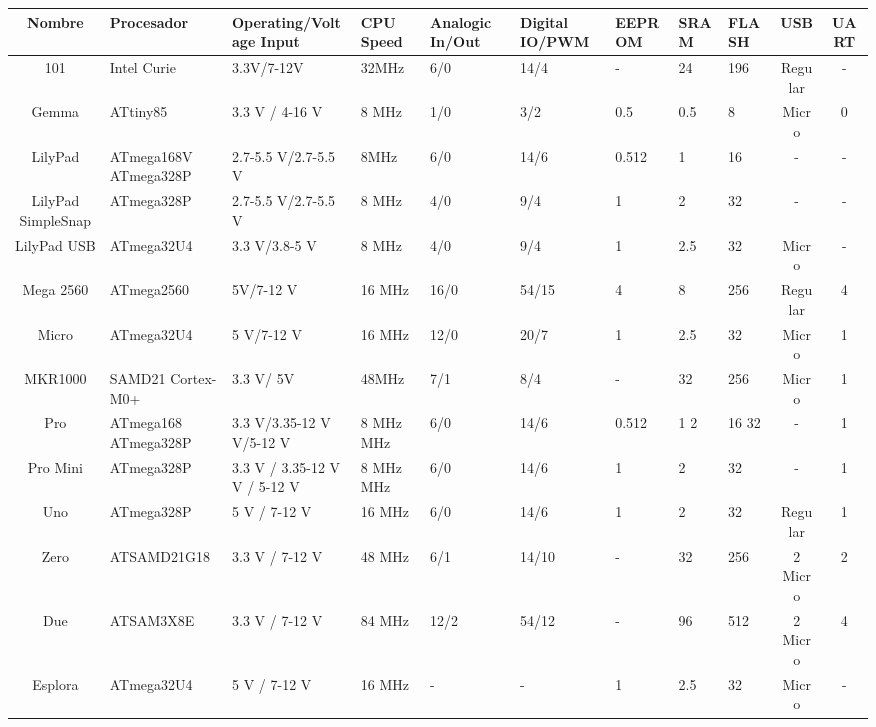 \documentclass[11pt,twoside]{book}
\begin{document}
\begin{table}[htb]
\begin{center}
\resizebox{16cm}{!} {
\begin{tabular}{|c|m{3cm}|m{3.5cm}|m{2cm}|m{2cm}|m{2cm}|m{2cm}|m{2cm}|m{2cm}|c|c|}
\hline
Nombre & Procesador & Operating/Voltage Input & CPU Speed & Analogic In/Out & Digital IO/PWM & EEPROM & SRAM & FLASH & USB & UART \\
\hline
101 & Intel Curie & 3.3V/7-12V & 32MHz & 6/0 & 14/4 & - & 24 & 196 & Regular & - \\ 
\hline
Gemma & ATtiny85 & 3.3 V / 4-16 V & 8 MHz & 1/0 & 3/2 & 0.5 & 0.5 & 8 & Micro & 0 \\
\hline
LilyPad & ATmega168V \newline ATmega328P & 2.7-5.5 V/2.7-5.5 V & 8MHz & 6/0 & 14/6 & 0.512 & 1 & 16 & - & - \\
\hline
LilyPad SimpleSnap & ATmega328P & 2.7-5.5 V/2.7-5.5 V & 8 MHz & 4/0 & 9/4 & 1 & 2 & 32 & - & - \\
\hline
LilyPad USB & ATmega32U4 & 3.3 V/3.8-5 V & 8 MHz & 4/0 & 9/4 & 1 & 2.5 & 32 & Micro & - \\
\hline
Mega 2560 & ATmega2560 & 5V/7-12 V & 16 MHz & 16/0 & 54/15 & 4 & 8 & 256 & Regular & 4 \\
\hline
Micro & ATmega32U4 & 5 V/7-12 V & 16 MHz & 12/0 & 20/7 & 1 & 2.5 & 32 & Micro & 1 \\
\hline
MKR1000 & SAMD21 Cortex-M0+ & 3.3 V/ 5V  & 48MHz  & 7/1 & 8/4 & - & 32 & 256 & Micro & 1 \\
\hline
Pro & ATmega168 ATmega328P & 3.3 V/3.35-12 V \newline  5 V/5-12 V & 8 MHz  \newline  16 MHz & 6/0 & 14/6 & 0.512 \newline 1 & 1   2 & 16  32 & - & 1 \\
\hline
Pro Mini & ATmega328P & 3.3 V / 3.35-12 V \newline  5 V / 5-12 V & 8 MHz \newline  16 MHz & 6/0 & 14/6 & 1 & 2 & 32 & - & 1 \\
\hline
Uno & ATmega328P & 5 V / 7-12 V & 16 MHz & 6/0 & 14/6 & 1 & 2 & 32 & Regular & 1 \\
\hline
Zero & ATSAMD21G18 & 3.3 V / 7-12 V & 48 MHz & 6/1 & 14/10 & - & 32 & 256 & 2 Micro & 2 \\
\hline
Due & ATSAM3X8E & 3.3 V / 7-12 V & 84 MHz & 12/2 & 54/12 & - & 96 & 512 & 2 Micro & 4\\
\hline
Esplora & ATmega32U4 & 5 V / 7-12 V & 16 MHz & - & - & 1 & 2.5 & 32 & Micro & - \\

\end{tabular}}
\end{center}
\end{table}
\end{document}
